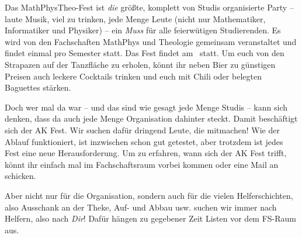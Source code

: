 
Das MathPhysTheo-Fest ist \emph{die} größte, komplett von Studis organisierte Party -- laute Musik, viel zu trinken, jede Menge Leute (nicht nur Mathematiker, Informatiker und Physiker) -- ein \emph{Muss} für alle feierwütigen Studierenden. Es wird von den Fachschaften MathPhys und Theologie gemeinsam veranstaltet und findet einmal pro Semester statt. Das Fest findet am \mathphystheotermin\ statt. Um euch von den Strapazen auf der Tanzfläche zu erholen, könnt ihr neben Bier zu günstigen Preisen auch leckere Cocktails trinken und euch mit Chili oder belegten Baguettes stärken.

Doch wer mal da war -- und das sind wie gesagt jede Menge Studis -- kann sich denken, dass da auch jede Menge Organisation dahinter steckt. Damit beschäftigt sich der AK Fest. Wir suchen dafür dringend Leute, die mitmachen! Wie der Ablauf funktioniert, ist inzwischen schon gut getestet, aber trotzdem ist jedes Fest eine neue Herausforderung. Um zu erfahren, wann sich der AK Fest trifft, könnt ihr einfach mal im Fachschaftsraum vorbei kommen oder eine Mail an  schicken.

Aber nicht nur für die Organisation, sondern auch für die vielen Helferschichten, also Ausschank an der Theke, Auf- und Abbau usw. suchen wir immer nach Helfern, also nach \emph{Dir}! Dafür hängen zu gegebener Zeit Listen vor dem FS-Raum aus.

